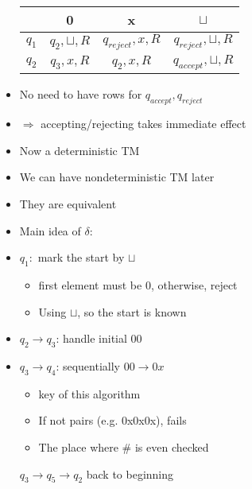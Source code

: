 \begin{frame}[allowframebreaks]
\begin{itemize}
  \begin{center}
\begin{tabular}{c|ccc}
& 0 & x & $\sqcup$\\ \hline
$q_1 $ & $q_2,\sqcup,R$ & $q_{reject},x,R$ & $q_{reject},\sqcup,
R$\\
$q_2$ & $q_3,x,R$ & $q_2,x,R$ & $q_{accept},\sqcup,R$
\end{tabular}
\end{center}

\item No need to have rows for $q_{accept},q_{reject}$

\item [] $\Rightarrow$ accepting/rejecting takes immediate effect

\item Now a deterministic TM

\item [] We can have nondeterministic TM later

\item [] They are equivalent

\item Main idea of $\delta$:

\item $q_1: $ mark the start by
$\sqcup$
\begin{itemize}
\item first element must be 0, otherwise, reject
\item Using $\sqcup$, so the start is known
\end{itemize}
\item $q_2 \rightarrow q_3$: handle initial 00

\item $q_3\rightarrow q_4$: sequentially $00 \rightarrow 0x$

  \begin{itemize}
  \item key of this algorithm
  \item If not pairs (e.g. 0x0x0x), fails
  \item The place where \# is even checked
  \end{itemize}
$q_3 \rightarrow q_5 \rightarrow q_2 $ back to beginning





\end{itemize}
\end{frame}
